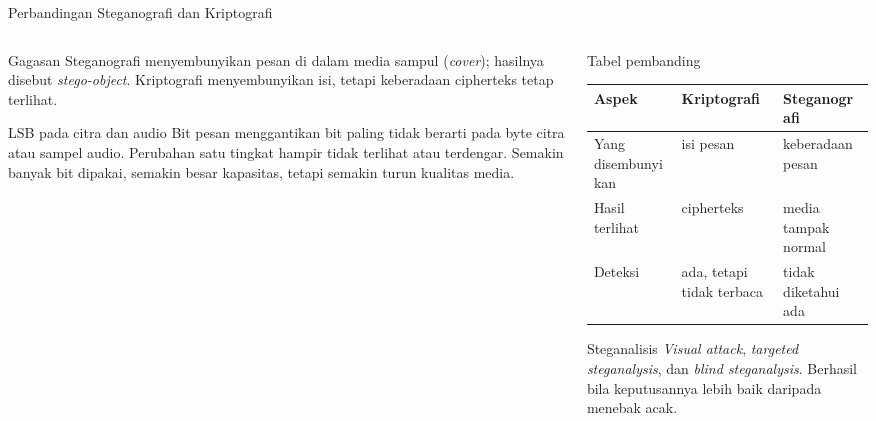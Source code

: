 \documentclass[aspectratio=169,11pt]{beamer}
\begin{document}
\begin{frame}{Perbandingan Steganografi dan Kriptografi}
    \scriptsize
    \begin{columns}[T,onlytextwidth]
        \begin{column}{0.49\textwidth}
            \begin{block}{Gagasan}
                Steganografi menyembunyikan  pesan di dalam
                media sampul (\textit{cover}); hasilnya disebut
                \textit{stego-object}. Kriptografi menyembunyikan isi, tetapi
                keberadaan cipherteks tetap terlihat.
            \end{block}
            \begin{block}{LSB pada citra dan audio}
                Bit pesan menggantikan bit paling tidak berarti pada byte
                citra atau sampel audio. Perubahan satu tingkat hampir tidak
                terlihat atau terdengar. Semakin banyak bit dipakai, semakin
                besar kapasitas, tetapi semakin turun kualitas media.
            \end{block}
        \end{column}
        \begin{column}{0.49\textwidth}
            \begin{block}{Tabel pembanding}
                \begin{tabularx}{\linewidth}{@{}>{\raggedright\arraybackslash}p{2.3cm} >{\raggedright\arraybackslash}X >{\raggedright\arraybackslash}X@{}}
                    \toprule
                    \textbf{Aspek} & \textbf{Kriptografi} & \textbf{Steganografi} \\
                    \midrule
                    Yang disembunyikan & isi pesan & keberadaan pesan \\
                    \addlinespace[0pt]
                    Hasil terlihat & cipherteks & media tampak normal \\
                    \addlinespace[0pt]
                    Deteksi & ada, tetapi tidak terbaca & tidak diketahui ada \\
                    \bottomrule
                \end{tabularx}
            \end{block}
            \begin{block}{Steganalisis}
                \textit{Visual attack}, \textit{targeted steganalysis}, dan
                \textit{blind steganalysis}. Berhasil bila keputusannya lebih
                baik daripada menebak acak.
            \end{block}
        \end{column}
    \end{columns}
\end{frame}
\end{document}
